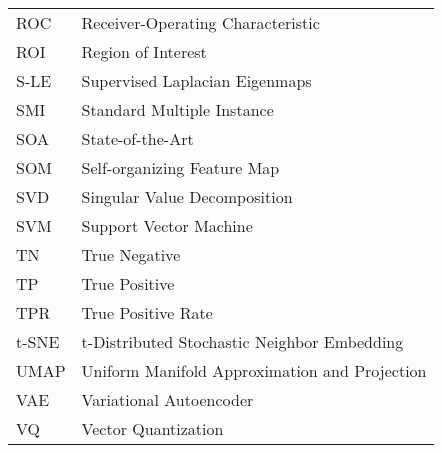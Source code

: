 \begin{longtable}{l p{5in}}
ROC & Receiver-Operating Characteristic\\
ROI & Region of Interest\\
S-LE & Supervised Laplacian Eigenmaps\\
SMI& Standard Multiple Instance\\
SOA & State-of-the-Art\\
SOM & Self-organizing Feature Map\\
SVD & Singular Value Decomposition\\
SVM & Support Vector Machine\\
TN & True Negative\\
TP & True Positive\\
TPR & True Positive Rate\\
t-SNE & t-Distributed Stochastic Neighbor Embedding\\
UMAP & Uniform Manifold Approximation and Projection\\
VAE & Variational Autoencoder\\
VQ & Vector Quantization\\

 \end{longtable}



\doublespacing

